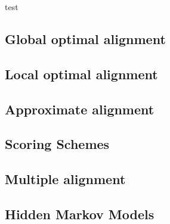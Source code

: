 
test

%

\subsection{Global optimal alignment}

\subsection{Local optimal alignment}

\subsection{Approximate alignment}

\subsection{Scoring Schemes}

\subsection{Multiple alignment}

\subsection{Hidden Markov Models}